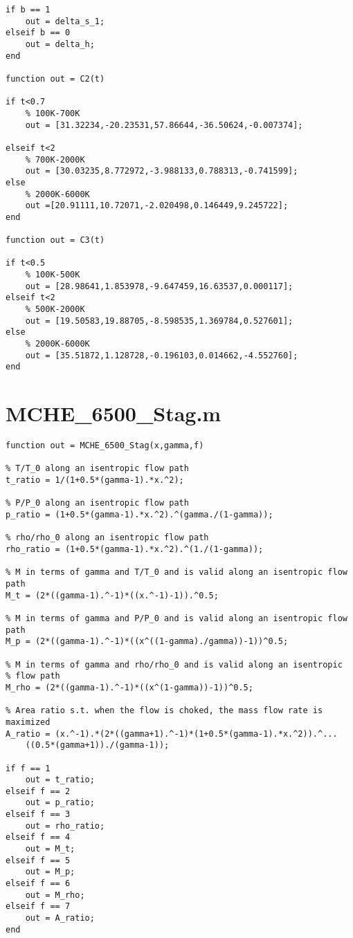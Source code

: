 \documentclass{article}
\begin{document}
\begin{lstlisting}[style=Matlab-editor]
if b == 1
    out = delta_s_1;
elseif b == 0
    out = delta_h;
end

function out = C2(t)

if t<0.7
    % 100K-700K
    out = [31.32234,-20.23531,57.86644,-36.50624,-0.007374];
    
elseif t<2
    % 700K-2000K
    out = [30.03235,8.772972,-3.988133,0.788313,-0.741599];
else
    % 2000K-6000K
    out =[20.91111,10.72071,-2.020498,0.146449,9.245722];
end

function out = C3(t)

if t<0.5
    % 100K-500K
    out = [28.98641,1.853978,-9.647459,16.63537,0.000117];
elseif t<2
    % 500K-2000K
    out = [19.50583,19.88705,-8.598535,1.369784,0.527601];
else
    % 2000K-6000K
    out = [35.51872,1.128728,-0.196103,0.014662,-4.552760];
end
\end{lstlisting}

\newpage
\section*{MCHE\_6500\_Stag.m}
\begin{lstlisting}[style=Matlab-editor]
function out = MCHE_6500_Stag(x,gamma,f)

% T/T_0 along an isentropic flow path 
t_ratio = 1/(1+0.5*(gamma-1).*x.^2);

% P/P_0 along an isentropic flow path
p_ratio = (1+0.5*(gamma-1).*x.^2).^(gamma./(1-gamma));

% rho/rho_0 along an isentropic flow path
rho_ratio = (1+0.5*(gamma-1).*x.^2).^(1./(1-gamma));

% M in terms of gamma and T/T_0 and is valid along an isentropic flow path
M_t = (2*((gamma-1).^-1)*((x.^-1)-1)).^0.5;

% M in terms of gamma and P/P_0 and is valid along an isentropic flow path
M_p = (2*((gamma-1).^-1)*((x^((1-gamma)./gamma))-1))^0.5;

% M in terms of gamma and rho/rho_0 and is valid along an isentropic 
% flow path
M_rho = (2*((gamma-1).^-1)*((x^(1-gamma))-1))^0.5;

% Area ratio s.t. when the flow is choked, the mass flow rate is maximized
A_ratio = (x.^-1).*(2*((gamma+1).^-1)*(1+0.5*(gamma-1).*x.^2)).^...
    ((0.5*(gamma+1))./(gamma-1));

if f == 1
    out = t_ratio;
elseif f == 2
    out = p_ratio;
elseif f == 3
    out = rho_ratio;
elseif f == 4
    out = M_t;
elseif f == 5
    out = M_p;
elseif f == 6
    out = M_rho;
elseif f == 7
    out = A_ratio;
end
\end{lstlisting}
\end{document}
